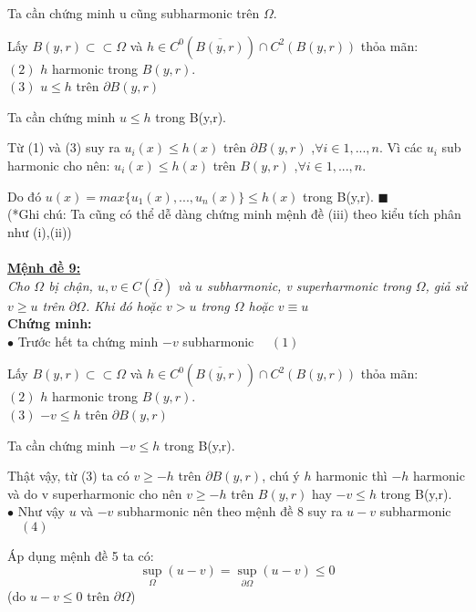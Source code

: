 Ta cần chứng minh u cũng subharmonic trên $\Omega.$

Lấy $B(y,r) \subset  \subset \Omega$ và  $h \in C^0(\overline {B(y,r)}) \cap C^2({B(y,r)}) $ thỏa mãn:
\\
$(2)$ $h$ harmonic trong $B(y,r).$
\\
$(3)$ $u \le h$ trên $\partial B(y,r)$

Ta cần chứng minh $u\le h$ trong B(y,r).

Từ (1) và (3) suy ra $u_i(x)\le h(x)$  trên $\partial B(y,r)$ ,$\forall i \in 1,...,n$. Vì các $u_i$ sub harmonic cho nên:  $u_i(x)\le h(x)$  trên $B(y,r)$ ,$\forall i \in 1,...,n$.

Do đó $u(x)=max\{u_1(x),...,u_n(x)\} \le h(x)$ trong B(y,r). $\blacksquare$
\\
(*Ghi chú: Ta cũng có thể dễ dàng chứng minh mệnh đề (iii) theo kiểu tích phân như (i),(ii))
\\
\\
{ \bf\underline{Mệnh đề 9:}}
\\
{\it Cho $\Omega$ bị chận, $u,v \in C(\overline \Omega  )$ và $u$ subharmonic, v superharmonic trong  $\Omega$, giả sử $v\ge u$ trên $\partial \Omega$. Khi đó hoặc $v>u$ trong $\Omega$ hoặc  $v \equiv u$}
\\
{ \bf{Chứng minh:}}
\\
$ \bullet$ Trước hết ta chứng minh $-v$ subharmonic   $\quad(1)$

Lấy $B(y,r) \subset  \subset \Omega$ và  $h \in C^0(\overline {B(y,r)}) \cap C^2({B(y,r)}) $ thỏa mãn:\\
$(2)$ $h$ harmonic trong $B(y,r).$\\
$(3)$ $-v \le h$ trên $\partial B(y,r)$

Ta cần chứng minh $-v \le h$ trong B(y,r).

Thật vậy, từ (3) ta có  $v \ge -h$ trên $\partial B(y,r)$, chú ý $h$ harmonic thì $-h$ harmonic và do v superharmonic cho nên $v \ge -h$ trên $ B(y,r)$ hay  $-v \le h$ trong B(y,r).
\\
$ \bullet$ Như vậy $u$ và $-v$ subharmonic nên theo mệnh đề 8 suy ra $u-v$ subharmonic  $\quad(4)$

Áp dụng mệnh đề 5 ta có:
$$\mathop {\sup }\limits_\Omega  (u-v) = \mathop {\sup }\limits_{\partial \Omega } (u-v)\le 0$$
(do $u-v\le 0$ trên $\partial \Omega$)

